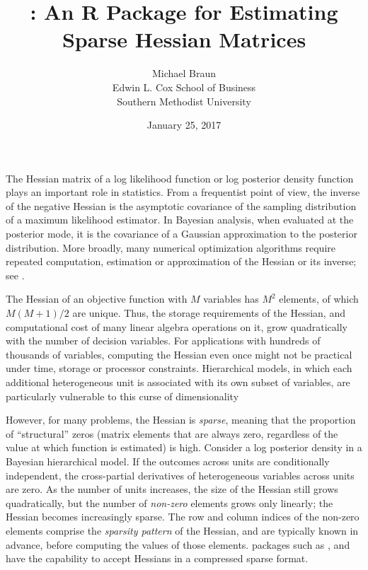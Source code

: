 \documentclass[jss]{jss}\usepackage[]{graphicx}\usepackage[]{color}
\author{Michael Braun\\Edwin L. Cox School of Business\\Southern Methodist University}
\title{\pkg{sparseHessianFD}: An R Package for Estimating Sparse Hessian Matrices}
\date{January 25, 2017}
\begin{document}
The Hessian matrix of a log likelihood function or log posterior
density function plays
an important role in statistics.  From a frequentist point of view,
the inverse of the negative Hessian is the asymptotic covariance of
the sampling distribution of a maximum
likelihood estimator.  In Bayesian analysis, when evaluated at the
posterior mode, it is the covariance of a Gaussian approximation to
the posterior distribution.  More broadly, many numerical optimization
algorithms require repeated computation, estimation or approximation
of the Hessian or its inverse; see \citet{NocedalWright2006}.

The Hessian of an objective function with $M$ variables has $M^2$
elements, of which $M(M+1)/2$ are unique.  Thus, the storage
requirements of the Hessian, and computational cost of many linear
algebra operations on it, grow quadratically with the number of
decision variables.   For
applications with hundreds of thousands of variables, computing the
Hessian even once might not be practical under time, storage or
processor constraints.  Hierarchical models, in
which each additional heterogeneous unit is associated with its own subset of
variables, are particularly vulnerable to this curse of dimensionality

However, for many problems, the Hessian is
\emph{sparse}, meaning that the proportion of  ``structural''  zeros
(matrix elements that are always zero, regardless of the value at which
function is estimated) is high.  Consider a log
posterior density in a Bayesian hierarchical
model.  If the outcomes across units are conditionally
independent, the cross-partial derivatives of heterogeneous variables
across units are zero.  As the number of units
increases, the size of the Hessian still grows quadratically, but the number
of \emph{non-zero} elements grows only linearly; the Hessian
becomes increasingly sparse.  The row and column indices of the
non-zero elements comprise the \emph{sparsity pattern} of the Hessian,
and are typically known in advance, before computing the values of
those elements.   packages such as 
\citep{R_trustOptim},  \citep{R_sparseMVN} and
 \citep{R_ipoptr} have the capability to accept Hessians
in a compressed sparse format.
\end{document}
